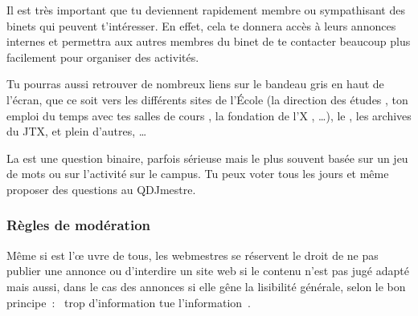 Il est très important que tu deviennent rapidement membre ou sympathisant des binets qui peuvent t'intéresser.
En effet, cela te donnera accès à leurs annonces internes et permettra aux autres membres du binet de te
contacter beaucoup plus facilement pour organiser des activités.


Tu pourras aussi retrouver de nombreux liens sur le bandeau gris en haut de l'écran, que ce soit vers les différents sites de l'École (la direction des études , ton emploi du temps avec tes salles de cours , la fondation de l'X , \dots), le , les archives du JTX, et plein d'autres, \dots


La  est une question binaire, parfois sérieuse mais le
plus souvent basée sur un jeu de mots ou sur l'activité sur le
campus. Tu peux voter tous les jours et même proposer des questions
au QDJmestre.

\subsubsection{Règles de modération}

Même si \fkz est l'œ uvre de tous, les webmestres se réservent le droit de ne pas publier une annonce ou d'interdire un site web si le contenu
n'est pas jugé adapté mais aussi, dans le cas des annonces si elle gêne la lisibilité générale, selon le bon principe~: \guillemotleft~trop
d'information tue l'information~\guillemotright .

